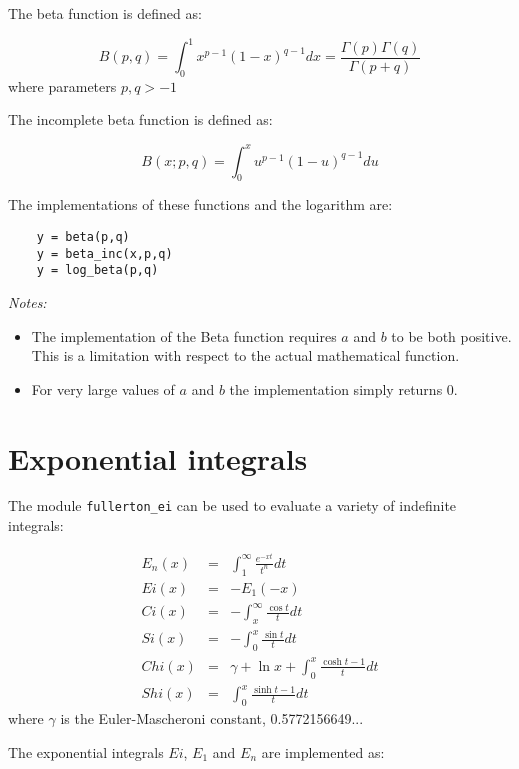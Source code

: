 \documentclass{article}
\begin{document}
The beta function is defined as:

\begin{equation}
    B(p,q) = \int_0^1 x^{p-1} (1 - x)^{q-1} dx = \frac{\Gamma(p)\Gamma(q)}{\Gamma(p+q)}
\end{equation}
\noindent where parameters $p, q > -1$

The incomplete beta function is defined as:

\begin{equation}
    B(x;p,q) = \int_0^x u^{p-1} (1 - u)^{q-1} du
\end{equation}

The implementations of these functions and the logarithm are:

\begin{verbatim}
    y = beta(p,q)
    y = beta_inc(x,p,q)
    y = log_beta(p,q)
\end{verbatim}

\emph{Notes:}
\begin{itemize}
\item
The implementation of the Beta function requires $a$ and $b$ to be both positive. This is a limitation with
respect to the actual mathematical function.
\item
For very large values of $a$ and $b$ the implementation simply returns 0.
\end{itemize}


\section{Exponential integrals}
The module \verb+fullerton_ei+ can be used to evaluate a variety of indefinite integrals:

\begin{eqnarray}
    E_n(x) &=& \int^\infty_1 \frac{e^{-xt}}{t^n} dt              \\
    Ei(x)  &=& -E_1(-x)                                          \\
    Ci(x)  &=& -\int^\infty_x \frac{\cos t}{t} dt                \\
    Si(x)  &=& -\int^x_0 \frac{\sin t}{t} dt                     \\
    Chi(x) &=& \gamma + \ln x + \int^x_0 \frac{\cosh t -1}{t} dt \\
    Shi(x) &=& \int^x_0 \frac{\sinh t -1}{t} dt
\end{eqnarray}
\noindent where $\gamma$ is the Euler-Mascheroni constant, 0.5772156649...

The exponential integrals $Ei$, $E_1$ and $E_n$ are implemented as:
\end{document}
